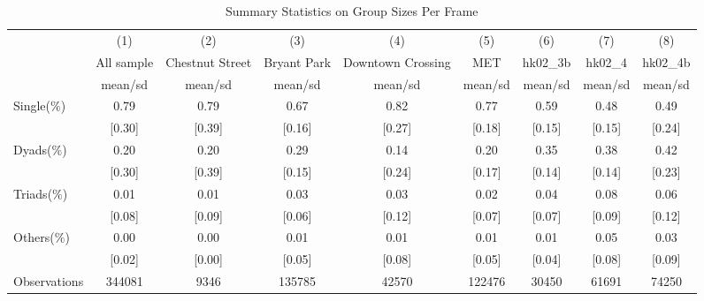 \begin{table}[htbp]\centering
\def\sym#1{\ifmmode^{#1}\else\(^{#1}\)\fi}
\caption{Summary Statistics on Group Sizes Per Frame\label{summary2y}}
\begin{tabular}{l*{8}{c}}
\toprule
                &\multicolumn{1}{c}{(1)}&\multicolumn{1}{c}{(2)}&\multicolumn{1}{c}{(3)}&\multicolumn{1}{c}{(4)}&\multicolumn{1}{c}{(5)}&\multicolumn{1}{c}{(6)}&\multicolumn{1}{c}{(7)}&\multicolumn{1}{c}{(8)}\\
                &\multicolumn{1}{c}{All sample}&\multicolumn{1}{c}{Chestnut Street}&\multicolumn{1}{c}{Bryant Park}&\multicolumn{1}{c}{Downtown Crossing}&\multicolumn{1}{c}{MET}&\multicolumn{1}{c}{hk02\_3b}&\multicolumn{1}{c}{hk02\_4}&\multicolumn{1}{c}{hk02\_4b}\\
                &  mean/sd&  mean/sd&  mean/sd&  mean/sd&  mean/sd&  mean/sd&  mean/sd&  mean/sd\\
\midrule
Single($\%$)    &     0.79&     0.79&     0.67&     0.82&     0.77&     0.59&     0.48&     0.49\\
                &   [0.30]&   [0.39]&   [0.16]&   [0.27]&   [0.18]&   [0.15]&   [0.15]&   [0.24]\\
Dyads($\%$)     &     0.20&     0.20&     0.29&     0.14&     0.20&     0.35&     0.38&     0.42\\
                &   [0.30]&   [0.39]&   [0.15]&   [0.24]&   [0.17]&   [0.14]&   [0.14]&   [0.23]\\
Triads($\%$)    &     0.01&     0.01&     0.03&     0.03&     0.02&     0.04&     0.08&     0.06\\
                &   [0.08]&   [0.09]&   [0.06]&   [0.12]&   [0.07]&   [0.07]&   [0.09]&   [0.12]\\
Others($\%$)    &     0.00&     0.00&     0.01&     0.01&     0.01&     0.01&     0.05&     0.03\\
                &   [0.02]&   [0.00]&   [0.05]&   [0.08]&   [0.05]&   [0.04]&   [0.08]&   [0.09]\\
\midrule
Observations    &   344081&     9346&   135785&    42570&   122476&    30450&    61691&    74250\\
\bottomrule
\end{tabular}
\end{table}
